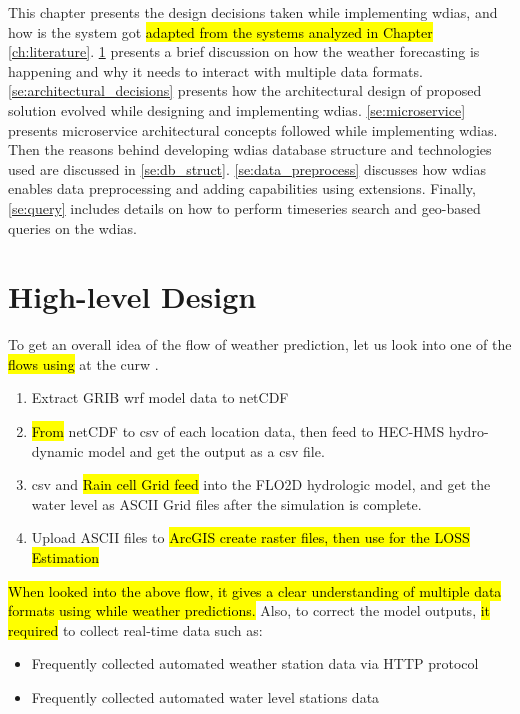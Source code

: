 This chapter presents the design decisions taken while implementing \acrfull{wdias}, and how is the system got \hl{adapted from the systems analyzed in Chapter} \ref{ch:literature}.
\cref{se:high_level_design} presents a brief discussion on how the weather forecasting is happening and why it needs to interact with multiple data formats.
\cref{se:architectural_decisions} presents how the architectural design of proposed solution evolved while designing and implementing \acrshort{wdias}.
\cref{se:microservice} presents %
microservice architectural concepts followed while implementing \acrshort{wdias}.
Then the reasons behind developing \acrshort{wdias} database structure and technologies used are discussed in \cref{se:db_struct}.
\cref{se:data_preprocess} discusses how \acrshort{wdias} enables data preprocessing and adding capabilities using extensions.
Finally, \cref{se:query} includes details on how to perform timeseries search and geo-based queries on the \acrshort{wdias}.

\section{High-level Design}
\label{se:high_level_design}

To get an overall idea of the flow of weather prediction, let us look into one of the \hl{flows using} at the \acrshort{curw} \cite{CUrWSL2017SL}.

\begin{enumerate}
    \item Extract \acrshort{GRIB} \acrshort{wrf} model data to \acrshort{netCDF}
    \item \hl{From} \acrshort{netCDF} to \acrshort{csv} of each location data, then feed to HEC-HMS hydro-dynamic model and get the output as a \acrshort{csv} file.
    \item \acrshort{csv} and \hl{Rain cell Grid feed} into the FLO2D hydrologic model, and get the water level as ASCII Grid files after the simulation is complete.
    \item Upload ASCII files to \hl{ArcGIS create raster files, then use for the LOSS Estimation}
\end{enumerate}

\hl{When looked into the above flow, it gives a clear understanding of multiple data formats using while weather predictions.}
Also, to correct the model outputs, \hl{it required} to collect real-time data such as:
\begin{itemize}
    \item Frequently collected automated weather station data via HTTP protocol
    \item Frequently collected automated water level stations data
\end{itemize}

